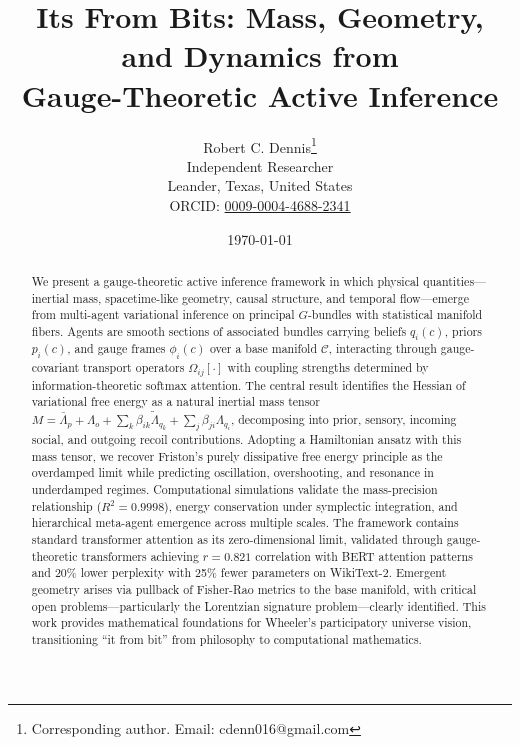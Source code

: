 \documentclass[11pt]{article}
\begin{document}
\title{Its From Bits: Mass, Geometry, and Dynamics from\\Gauge-Theoretic Active Inference}

\author{
  Robert C. Dennis\thanks{Corresponding author. Email: cdenn016@gmail.com}\\[0.3cm]
  \small Independent Researcher\\
  \small Leander, Texas, United States\\[0.2cm]
  \small ORCID: \href{https://orcid.org/0009-0004-4688-2341}{0009-0004-4688-2341}
}

\date{\today}

\maketitle

\begin{abstract}
We present a gauge-theoretic active inference framework in which physical quantities---inertial mass, spacetime-like geometry, causal structure, and temporal flow---emerge from multi-agent variational inference on principal $G$-bundles with statistical manifold fibers. Agents are smooth sections of associated bundles carrying beliefs $q_i(c)$, priors $p_i(c)$, and gauge frames $\phi_i(c)$ over a base manifold $\mathcal{C}$, interacting through gauge-covariant transport operators $\Omega_{ij}[\cdot]$ with coupling strengths determined by information-theoretic softmax attention. The central result identifies the Hessian of variational free energy as a natural inertial mass tensor $M = \bar{\Lambda}_p + \Lambda_o + \sum_k \beta_{ik}\tilde{\Lambda}_{q_k} + \sum_j \beta_{ji}\Lambda_{q_i}$, decomposing into prior, sensory, incoming social, and outgoing recoil contributions. Adopting a Hamiltonian ansatz with this mass tensor, we recover Friston's purely dissipative free energy principle as the overdamped limit while predicting oscillation, overshooting, and resonance in underdamped regimes. Computational simulations validate the mass-precision relationship ($R^2 = 0.9998$), energy conservation under symplectic integration, and hierarchical meta-agent emergence across multiple scales. The framework contains standard transformer attention as its zero-dimensional limit, validated through gauge-theoretic transformers achieving $r = 0.821$ correlation with BERT attention patterns and 20\% lower perplexity with 25\% fewer parameters on WikiText-2. Emergent geometry arises via pullback of Fisher-Rao metrics to the base manifold, with critical open problems---particularly the Lorentzian signature problem---clearly identified. This work provides mathematical foundations for Wheeler's participatory universe vision, transitioning ``it from bit'' from philosophy to computational mathematics.
\end{abstract}
\end{document}

